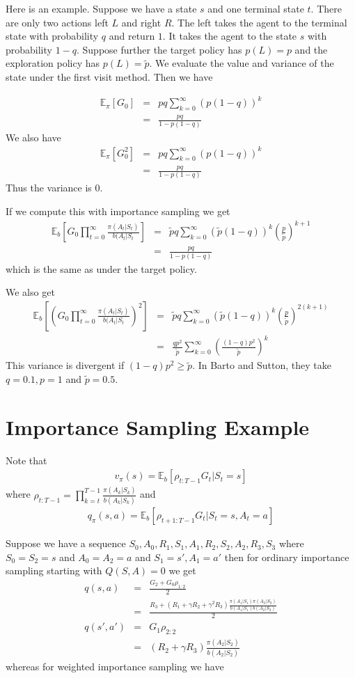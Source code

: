\documentclass[11pt,a4paper]{article}
\newcommand\bea{\begin{eqnarray}}
\newcommand\eea{\end{eqnarray}}
\newcommand{\nn}{\nonumber \\}
\begin{document}
Here is an example. Suppose we have a state $s$ and one terminal state $t$. There are only two actions left $L$ and right $R$. The left takes the agent to the terminal state with probability $q$ and return $1$. It takes the agent to the state $s$ with probability $1-q$. Suppose further the target policy has $p(L)=p$ and the exploration policy has $p(L)=\tilde p$. We evaluate the value and variance of the state under the first visit method. Then we have

\bea
\mathbb E_\pi[G_0] &=& pq \sum_{k=0}^\infty (p (1-q))^k \nn
&=& \frac{pq}{1-p(1-q)}
\eea
We also have
\bea
\mathbb E_\pi[G_0^2] &=& pq \sum_{k=0}^\infty (p (1-q))^k \nn
&=& \frac{pq}{1-p(1-q)}
\eea
Thus the variance is 0.

If we compute this with importance sampling we get
\bea
\mathbb E_b[G_0 \prod_{t=0}^\infty \frac{\pi(A_t|S_t)}{b(A_t|S_t}] &=& \tilde pq \sum_{k=0}^\infty (\tilde p (1-q))^k \left( \frac{p}{\tilde p} \right)^{k+1} \nn
&=& \frac{pq}{1-p(1-q)}
\eea
which is the same as under the target policy.

We also get
\bea
\mathbb E_b[\left(G_0 \prod_{t=0}^\infty \frac{\pi(A_t|S_t)}{b(A_t|S_t}\right)^2] &=& \tilde pq \sum_{k=0}^\infty (\tilde p (1-q))^k \left( \frac{p}{\tilde p} \right)^{2(k+1)} \nn
&=& \frac{qp^2}{\tilde p} \sum_{k=0}^\infty \left( \frac{(1-q) p^2}{\tilde p}\right)^k
\eea
This variance is divergent if $(1-q)p^2 \ge \tilde p$. In Barto and Sutton, they take $q=0.1, p=1$ and $\tilde p=0.5$.


\appendix

\section{Importance Sampling Example}
Note that
\bea
v_\pi(s) = \mathbb E_b [ \rho_{t:T-1} G_t | S_t=s]
\eea
where $\rho_{t:T-1} = \prod_{k=t}^{T-1} \frac{\pi(A_k|S_k)}{b(A_k|S_k)}$ and
\bea
q_\pi(s,a) = \mathbb E_b [ \rho_{t+1:T-1} G_t | S_t=s, A_t=a]
\eea


Suppose we have a sequence $S_0,A_0,R_1,S_1,A_1,R_2,S_2,A_2,R_3,S_3$ where $S_0=S_2=s$ and $A_0=A_2=a$ and $S_1=s',A_1=a'$ then for ordinary importance sampling starting with $Q(S,A)=0$ we get
\bea
q(s,a) &=& \frac{G_2 + G_0 \rho_{1:2}}{2} \nn
&=&  \frac{ R_3 + (R_1 + \gamma R_2 + \gamma^2 R_3) \frac{\pi(A_1|S_1)\pi(A_2|S_2)}{b(A_1|S_1)b(A_2|S_2)}}{2} \\
q(s',a') &=& G_1 \rho_{2:2} \nn
&=& (R_2 + \gamma R_3) \frac{\pi(A_2|S_2)}{b(A_2|S_2)}
\eea
whereas for weighted importance sampling we have
\end{document}
